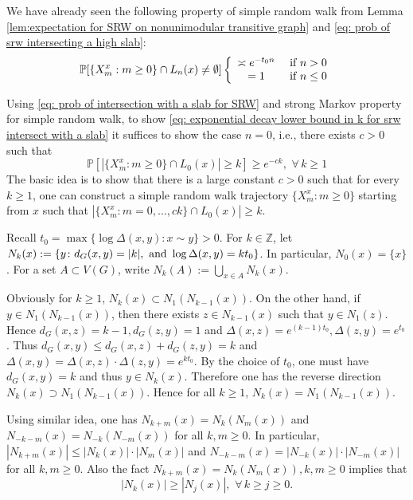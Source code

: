 \documentclass[12pt]{article}
\numberwithin{equation}{section}
\newcommand{\be}{\begin{equation}}
\newcommand{\ee}{\end{equation}}
\newcommand{\1}{\mathbf{1}}
\begin{document}
We have already seen the following property of simple random walk from Lemma \ref{lem:expectation for SRW on nonunimodular transitive graph} and \eqref{eq: prob of srw intersecting a high slab}:
	\be\label{eq: prob of intersection with a slab for SRW}
	\mathbb{P}[\{X_m^x:m\geq 0\}\cap L_n(x)\neq \emptyset]
	\left\{
	\begin{array}{cc}
	\asymp e^{-t_0n} & \textnormal{ if }n>0\\
	=1 & \textnormal{ if }n\leq0
	\end{array}
	\right.
	\ee

Using \eqref{eq: prob of intersection with a slab for SRW} and strong Markov property for simple random walk, to show \eqref{eq: exponential decay lower bound in k for srw intersect with a slab} it suffices to show the case $n=0$, i.e., there exists $c>0$ such that 
\be\label{eq: lower bound of exponential decay for srw intersect with L_0(x)}
	\mathbb{P}[|\{X_m^x:m\geq 0\}\cap L_0(x)|\geq k]\geq e^{-ck},\,\,\forall\, k\geq 1
\ee
The basic idea is to show that there is a large constant $c>0$ such that for every $k\geq 1$, one can construct a simple  random walk trajectory $\{X_m^x\colon m\geq0\}$ starting from $x$ such that  $|\{X_m^x\colon m=0,\ldots,ck\}\cap L_0(x)|\geq k$.


Recall $t_0=\max\{\log\Delta(x,y)\colon x\sim y\}>0$. For $k\in \mathbb{Z}$, let $N_{k}(x):=\{y\colon d_G(x,y)=|k|, \textnormal{ and }\log \Delta(x,y)=kt_0 \}$. In particular, $N_0(x)=\{x\}$. For a set $A\subset V(G)$, write $N_k(A):=\bigcup_{x\in A} N_k(x)$. 

Obviously for $k\geq 1$,  $N_k(x)\subset N_1(N_{k-1}(x))$. On the other hand, if $y\in N_1(N_{k-1}(x))$, then there exists $z\in N_{k-1}(x)$ such that $y\in N_1(z)$. Hence 
$d_G(x,z)=k-1,d_G(z,y)=1$ and $\Delta(x,z)=e^{(k-1)t_0}, \Delta(z,y)=e^{t_0}$. Thus 
$d_G(x,y)\leq d_G(x,z)+d_G(z,y)=k$ and $\Delta(x,y)=\Delta(x,z)\cdot \Delta(z,y)=e^{kt_0}$. By the choice of $t_0$, one must have $d_G(x,y)=k$ and thus $y\in N_k(x)$. Therefore one has the reverse direction $N_k(x)\supset N_1(N_{k-1}(x))$. Hence  for all $k\geq1$, $N_k(x)=N_1(N_{k-1}(x))$. 

Using similar idea, one has $N_{k+m}(x)=N_k(N_m(x))$ and $N_{-k-m}(x)=N_{-k}(N_{-m}(x))$ for all $k,m\geq0$. In particular, $|N_{k+m}(x)|\leq |N_k(x)|\cdot |N_{m}(x)|$ and $N_{-k-m}(x)=|N_{-k}(x)|\cdot |N_{-m}(x)|$ for all $k,m\geq0$. Also the fact $N_{k+m}(x)=N_k(N_m(x)),k,m\geq0$ implies that 
\be\label{eq: increasing for N_k}
|N_{k}(x)|\geq |N_{j}(x)|,\,\,\forall\, k\geq j\geq 0.
\ee
\end{document}

